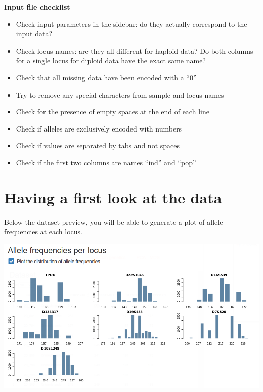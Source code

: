 \documentclass[
]{book}
\providecommand{\tightlist}{%
  \setlength{\itemsep}{0pt}\setlength{\parskip}{0pt}}
\begin{document}
\begin{interpretation}

\textbf{Input file checklist}

\begin{itemize}
\tightlist
\item
  Check input parameters in the sidebar: do they actually correspond to the input data?
\item
  Check locus names: are they all different for haploid data? Do both columns for a single locus for diploid data have the exact same name?
\item
  Check that all missing data have been encoded with a ``0''
\item
  Try to remove any special characters from sample and locus names
\item
  Check for the presence of empty spaces at the end of each line
\item
  Check if alleles are exclusively encoded with numbers
\item
  Check if values are separated by tabs and not spaces
\item
  Check if the first two columns are names ``ind'' and ``pop''
\end{itemize}


\end{interpretation}

\hypertarget{having-a-first-look-at-the-data}{%
\section{Having a first look at the data}\label{having-a-first-look-at-the-data}}

Below the dataset preview, you will be able to generate a plot of allele frequencies
at each locus.

\includegraphics[width=1\linewidth]{img/capture_import_2}
\end{document}
